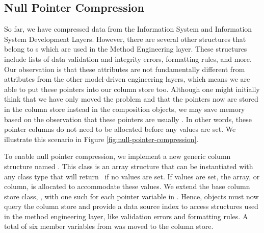 \subsection{Null Pointer Compression}
\label{compression:null-pointer-compression}


So far, we have compressed data from the Information System and Information System Development Layers. However, there are several other structures that belong to s which are used in the Method Engineering layer. These structures include lists of data validation and integrity errors, formatting rules, and more. Our observation is that these attributes are not fundamentally different from attributes from the other model-driven engineering layers, which means we are able to put these pointers into our column store too. Although one might initially think that we have only moved the problem and that the pointers now are stored in the column store instead in the composition objects, we may save memory based on the observation that these pointers are usually \nil. In other words, these pointer columns do not need to be allocated before any values are set. We illustrate this scenario in Figure \ref{fig:null-pointer-compression}.

To enable null pointer compression, we implement a new generic column structure named . This class is an array structure that can be instantiated with any class type that will return \nil~if no values are set. If values are set, the array, or column, is allocated to accommodate these values. We extend the base column store class, , with one such  for each pointer variable in . Hence, objects must now query the column store and provide a data source index to access structures used in the method engineering layer, like validation errors and formatting rules. A total of six member variables from  was moved to the column store.

